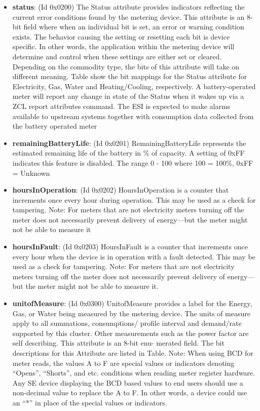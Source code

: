 \begin{itemize}
\item \textbf{status}: (Id 0x0200) The Status attribute provides indicators reflecting the current error conditions found by the metering device. This attribute is an 8-bit field where when an individual bit is set, an error or warning condition exists. The behavior causing the setting or resetting each bit is device specific. In other words, the application within the metering device will determine and control when these settings are either set or cleared. Depending on the commodity type, the bits of this attribute will take on different meaning. Table show the bit mappings for the Status attribute for Electricity, Gas, Water and Heating/Cooling, respectively. A battery-operated meter will report any change in state of the Status when it wakes up via a ZCL report attributes command. The ESI is expected to make alarms available to upstream systems together with consumption data collected from the battery operated meter
\item \textbf{remainingBatteryLife}: (Id 0x0201) RemainingBatteryLife represents the estimated remaining life of the battery in \% of capacity. A setting of 0xFF indicates this feature is disabled. The range 0 - 100 where 100 = 100\%, 0xFF = Unknown
\item \textbf{hoursInOperation}: (Id 0x0202) HoursInOperation is a counter that increments once every hour during operation. This may be used as a check for tampering. Note: For meters that are not electricity meters turning off the meter does not necessarily prevent delivery of energy—but the meter might not be able to measure it
\item \textbf{hoursInFault}: (Id 0x0203) HoursInFault is a counter that increments once every hour when the device is in operation with a fault detected. This may be used as a check for tampering. Note: For meters that are not electricity meters turning off the meter does not necessarily prevent delivery of energy—but the meter might not be able to measure it.
\item \textbf{unitofMeasure}: (Id 0x0300) UnitofMeasure provides a label for the Energy, Gas, or Water being measured by the metering device. The units of measure apply to all summations, consumptions/ profile interval and demand/rate supported by this cluster. Other measurements such as the power factor are self describing. This attribute is an 8-bit enu- merated field. The bit descriptions for this Attribute are listed in Table. Note: When using BCD for meter reads, the values A to F are special values or indicators denoting “Opens”, “Shorts”, and etc. conditions when reading meter register hardware. Any SE device displaying the BCD based values to end users should use a non-decimal value to replace the A to F. In other words, a device could use an “*” in place of the special values or indicators.

\end{itemize}
